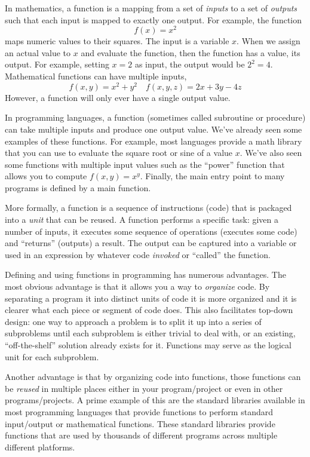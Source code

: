 
\label{chapter:functions}


In mathematics, a function is a mapping from a set of \emph{inputs}
to a set of \emph{outputs} such that each input is mapped to exactly one
output.  For example, the function 
  $$f(x) = x^2$$
maps numeric values to their squares.  The input is a variable $x$.  When
we assign an actual value to $x$ and evaluate the function, then the function
has a value, its output.  For example, setting $x = 2$ as input, the output
would be $2^2 = 4$.  Mathematical functions can have multiple inputs, 
  $$f(x,y) = x^2 + y^2 \quad f(x, y, z) = 2x + 3y - 4z$$
However, a function will only ever have a single output value.

In programming languages, a \gls{function} (sometimes called subroutine 
or procedure) can take multiple inputs and produce one output value.  We've 
already seen some examples of these functions.  For example, most languages 
provide a math library that you can use to evaluate the square root or 
sine of a value $x$.  We've also seen some functions with multiple input 
values such as the ``power'' function that allows you to compute $f(x, y) = x^y$.
Finally, the main entry point to many programs is defined by a main function.

More formally, a function is a sequence of instructions (code) that is 
packaged into a \emph{unit} that can be reused.  A function performs 
a specific task: given a number of inputs, it executes some sequence 
of operations (executes some code) and ``returns'' (outputs) a result.
The output can be captured into a variable or used in an expression by 
whatever code \emph{invoked} or ``called'' the function.

Defining and using functions in programming has numerous advantages.
The most obvious advantage is that it allows you a way to \emph{organize} 
code.  By separating a program it into distinct units of code it is more organized 
and it is clearer what each piece or segment of code does.  This also 
facilitates  \gls{top-down design}: one way to approach a problem is to 
split it up into a series of subproblems until each subproblem is either trivial 
to deal  with, or an existing, ``off-the-shelf'' solution already exists for it.
Functions may serve as the logical unit for each subproblem.  

Another advantage is that by organizing code into functions, those functions 
can be \emph{reused} in multiple places either in your program/project 
or even in other programs/projects.  A prime example of this are the standard
libraries available in most programming languages that provide functions
to perform standard input/output or mathematical functions.  These standard
libraries provide functions that are used by thousands of different programs
across multiple different platforms.

